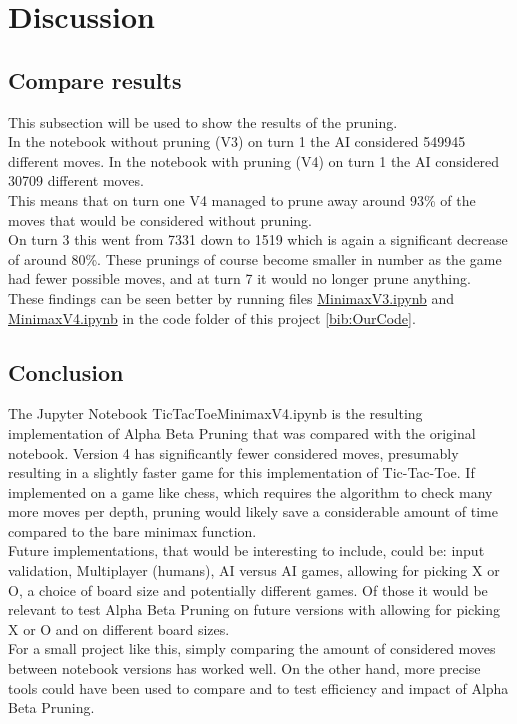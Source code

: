 \section{Discussion} 
\label{sec:Discussion}

\subsection{Compare results}
This subsection will be used to show the results of the pruning.\\
In the notebook without pruning (V3) on turn 1 the AI considered 549945 different moves.
In the notebook with pruning (V4) on turn 1 the AI considered 30709 different moves.\\
This means that on turn one V4 managed to prune away around 93\% of the moves that would be considered without pruning.\\
On turn 3 this went from 7331 down to 1519 which is again a significant decrease of around 80\%.
These prunings of course become smaller in number as the game had fewer possible moves, and at turn 7 it would no longer prune anything.\\
These findings can be seen better by running files \href{https://github.com/FrederikBlem/UFO_Exam_Minimax_Paper/blob/main/code/TicTacToe_MinimaxV3.ipynb}{MinimaxV3.ipynb} 
and \href{https://github.com/FrederikBlem/UFO_Exam_Minimax_Paper/blob/main/code/TicTacToe_MinimaxV4.ipynb}{MinimaxV4.ipynb} in the code folder of this project \ref{bib:OurCode}.

\subsection{Conclusion}
The Jupyter Notebook TicTacToe\textunderscore MinimaxV4.ipynb is the resulting implementation of 
Alpha Beta Pruning that was compared with the original notebook.
Version 4 has significantly fewer considered moves, presumably resulting in a slightly faster game 
for this implementation of Tic-Tac-Toe.
If implemented on a game like chess, which requires the algorithm to check many more moves per depth, 
pruning would likely save a considerable amount of time compared to the bare minimax function.\\
Future implementations, that would be interesting to include, could be: input validation, Multiplayer (humans), AI versus AI games, allowing for picking X or O, 
a choice of board size and potentially different games. Of those it would be relevant to test Alpha Beta Pruning on future versions 
with allowing for picking X or O and on different board sizes.\\
For a small project like this, simply comparing the amount of considered moves between notebook versions has worked well.
On the other hand, more precise tools could have been used to compare and to test efficiency and impact of Alpha Beta Pruning.
\clearpage
